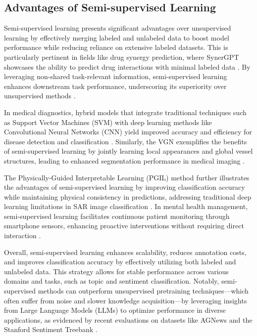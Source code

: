 
\subsection{Advantages of Semi-supervised Learning} \label{subsec:Advantages of Semi-supervised Learning}

Semi-supervised learning presents significant advantages over unsupervised learning by effectively merging labeled and unlabeled data to boost model performance while reducing reliance on extensive labeled datasets. This is particularly pertinent in fields like drug synergy prediction, where SynerGPT showcases the ability to predict drug interactions with minimal labeled data \cite{edwards2023synergptincontextlearningpersonalized}. By leveraging non-shared task-relevant information, semi-supervised learning enhances downstream task performance, underscoring its superiority over unsupervised methods \cite{wang2022rethinkingminimalsufficientrepresentation}.

In medical diagnostics, hybrid models that integrate traditional techniques such as Support Vector Machines (SVM) with deep learning methods like Convolutional Neural Networks (CNN) yield improved accuracy and efficiency for disease detection and classification \cite{zolfaghari2023surveyautomateddetectionclassification}. Similarly, the VGN exemplifies the benefits of semi-supervised learning by jointly learning local appearances and global vessel structures, leading to enhanced segmentation performance in medical imaging \cite{shin2018deepvesselsegmentationlearning}.

The Physically-Guided Interpretable Learning (PGIL) method further illustrates the advantages of semi-supervised learning by improving classification accuracy while maintaining physical consistency in predictions, addressing traditional deep learning limitations in SAR image classification \cite{huang2022physicallyexplainablecnnsar}. In mental health management, semi-supervised learning facilitates continuous patient monitoring through smartphone sensors, enhancing proactive interventions without requiring direct interaction \cite{jeong2016predictiveanalyticsusingsmartphone}.

Overall, semi-supervised learning enhances scalability, reduces annotation costs, and improves classification accuracy by effectively utilizing both labeled and unlabeled data. This strategy allows for stable performance across various domains and tasks, such as topic and sentiment classification. Notably, semi-supervised methods can outperform unsupervised pretraining techniques—which often suffer from noise and slower knowledge acquisition—by leveraging insights from Large Language Models (LLMs) to optimize performance in diverse applications, as evidenced by recent evaluations on datasets like AGNews and the Stanford Sentiment Treebank \cite{ginzburg2021selfsuperviseddocumentsimilarityranking,tang2023mvpmultitasksupervisedpretraining,jang2024visualdeltageneratorlarge,gao2023benefitslabeldescriptiontrainingzeroshot}.


